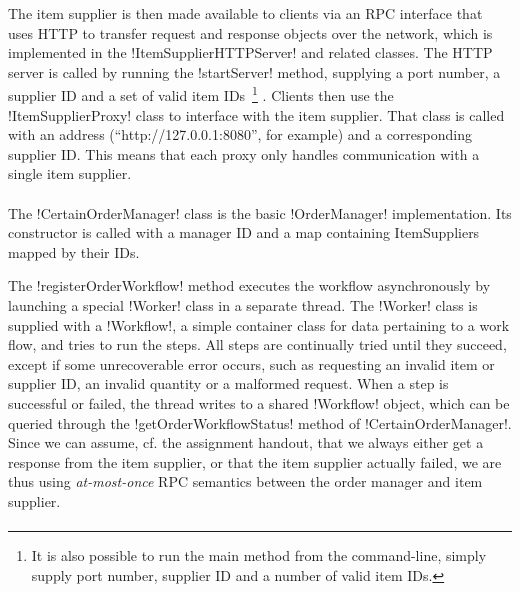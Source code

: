 \documentclass[a4paper, 12pt]{article}
\begin{document}
The item supplier is then made available to clients via an RPC
interface that uses HTTP to transfer request and response objects over
the network, which is implemented in the !ItemSupplierHTTPServer! and
related classes. The HTTP server is called by running the
!startServer! method, supplying a port number, a supplier ID and a set
of valid item IDs~\footnote{It is also possible to run the main method
  from the command-line, simply supply port number, supplier ID and a
  number of valid item IDs. } . Clients then use the
!ItemSupplierProxy! class to interface with the item supplier. That
class is called with an address (``http://127.0.0.1:8080'', for
example) and a corresponding supplier ID. This means that each proxy
only handles communication with a single item supplier.

\paragraph{}

The !CertainOrderManager! class is the basic !OrderManager!
implementation. Its constructor is called with a manager ID and a map
containing ItemSuppliers mapped by their IDs.

The !registerOrderWorkflow! method executes the workflow
asynchronously by launching a special !Worker! class in a separate
thread. The !Worker! class is supplied with a !Workflow!, a simple
container class for data pertaining to a work flow, and tries to run
the steps. All steps are continually tried until they succeed, except
if some unrecoverable error occurs, such as requesting an invalid item
or supplier ID, an invalid quantity or a malformed request. When a
step is successful or failed, the thread writes to a shared !Workflow!
object, which can be queried through the !getOrderWorkflowStatus!
method of !CertainOrderManager!. Since we can assume, cf. the
assignment handout, that we always either get a response from the item
supplier, or that the item supplier actually failed, we are thus using
\emph{at-most-once} RPC semantics between the order manager and item
supplier.

\paragraph{}
\end{document}
